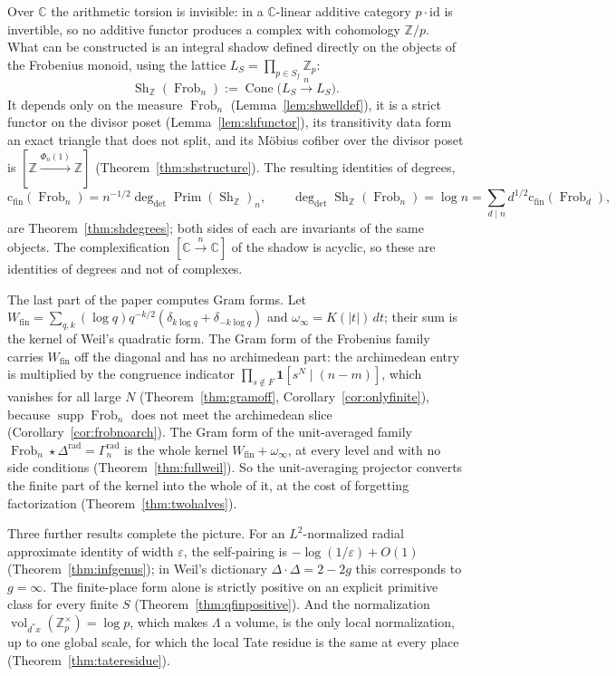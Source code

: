 \documentclass[11pt]{amsart}
\theoremstyle{definition}
\theoremstyle{remark}
\newcommand{\C}{\mathbb C}
\newcommand{\Z}{\mathbb Z}
\newcommand{\Frob}{\operatorname{Frob}}
\newcommand{\Sh}{\operatorname{Sh}}
\newcommand{\Prim}{\operatorname{Prim}}
\newcommand{\supp}{\operatorname{supp}}
\newcommand{\vol}{\operatorname{vol}}
\newcommand{\Cone}{\operatorname{Cone}}
\newcommand{\degdet}{\operatorname{deg}_{\mathrm{det}}}
\newcommand{\cfin}{\mathrm{c}_{\mathrm{fin}}}
\begin{document}
Over $\C$ the arithmetic torsion is invisible: in a $\C$-linear additive
category $p\cdot\mathrm{id}$ is invertible, so no additive functor produces a
complex with cohomology $\Z/p$.  What can be constructed is an integral shadow
defined directly on the objects of the Frobenius monoid, using the lattice
$L_S=\prod_{p\in S_f}\Z_p$:
\[
  \Sh_\Z(\Frob_n):=\Cone\bigl(L_S\xrightarrow{\ n\ }L_S\bigr).
\]
It depends only on the measure $\Frob_n$ (Lemma~\ref{lem:shwelldef}), it is a
strict functor on the divisor poset (Lemma~\ref{lem:shfunctor}), its
transitivity data form an exact triangle that does not split, and its
M\"obius cofiber over the divisor poset is $[\Z\xrightarrow{\Phi_n(1)}\Z]$
(Theorem~\ref{thm:shstructure}).  The resulting identities of degrees,
\[
  \cfin(\Frob_n)=n^{-1/2}\degdet\Prim(\Sh_\Z)_n,\qquad
  \degdet\Sh_\Z(\Frob_n)=\log n=\sum_{d\mid n}d^{1/2}\cfin(\Frob_d),
\]
are Theorem~\ref{thm:shdegrees}; both sides of each are invariants of the same
objects.  The complexification $[\C\xrightarrow{n}\C]$ of the shadow is
acyclic, so these are identities of degrees and not of complexes.

The last part of the paper computes Gram forms.  Let
$W_{\mathrm{fin}}=\sum_{q,k}(\log q)q^{-k/2}(\delta_{k\log q}+\delta_{-k\log
q})$ and $\omega_\infty=K(|t|)\,dt$; their sum is the kernel of Weil's
quadratic form.  The Gram form of the Frobenius family carries
$W_{\mathrm{fin}}$ off the diagonal and has no archimedean part: the
archimedean entry is multiplied by the congruence indicator
$\prod_{s\notin F}\mathbf 1[s^N\mid (n-m)]$, which vanishes for all large $N$
(Theorem~\ref{thm:gramoff}, Corollary~\ref{cor:onlyfinite}), because
$\supp\Frob_n$ does not meet the archimedean slice
(Corollary~\ref{cor:frobnoarch}).  The Gram form of the unit-averaged family
$\Frob_n\star\Delta^{\mathrm{rad}}=\Gamma_n^{\mathrm{rad}}$ is the whole kernel
$W_{\mathrm{fin}}+\omega_\infty$, at every level and with no side conditions
(Theorem~\ref{thm:fullweil}).  So the unit-averaging projector converts the
finite part of the kernel into the whole of it, at the cost of forgetting
factorization (Theorem~\ref{thm:twohalves}).

Three further results complete the picture.  For an $L^2$-normalized radial
approximate identity of width $\varepsilon$, the self-pairing is
$-\log(1/\varepsilon)+O(1)$ (Theorem~\ref{thm:infgenus}); in Weil's dictionary
$\Delta\cdot\Delta=2-2g$ this corresponds to $g=\infty$.  The finite-place
form alone is strictly positive on an explicit primitive class for every finite
$S$ (Theorem~\ref{thm:qfinpositive}).  And the normalization
$\vol_{d^*x}(\Z_p^\times)=\log p$, which makes $\Lambda$ a volume, is the only
local normalization, up to one global scale, for which the local Tate residue
is the same at every place (Theorem~\ref{thm:tateresidue}).
\end{document}
